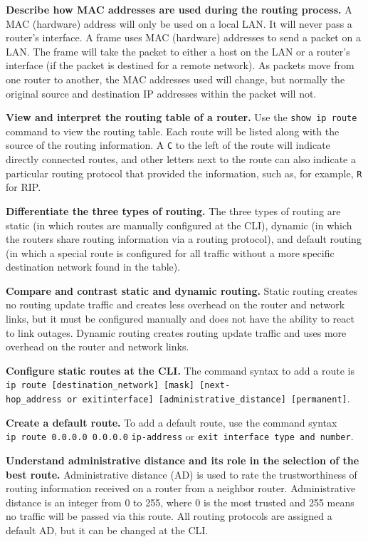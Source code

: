 \textbf{Describe how MAC addresses are used during the routing process.}
A MAC (hardware) address will only be used on a local LAN. It will never
pass a router's interface. A frame uses MAC (hardware) addresses to send
a packet on a LAN. The frame will take the packet to either a host on
the LAN or a router's interface (if the packet is destined for a remote
network). As packets move from one router to another, the MAC addresses
used will change, but normally the original source and destination IP
addresses within the packet will not.

\textbf{View and interpret the routing table of a router.} Use the
\texttt{show\ ip\ route} command to view the routing table. Each route
will be listed along with the source of the routing information. A
\texttt{C} to the left of the route will indicate directly connected
routes, and other letters next to the route can also indicate a
particular routing protocol that provided the information, such as, for
example, \texttt{R} for RIP.

\textbf{Differentiate the three types of routing.} The three types of
routing are static (in which routes are manually configured at the CLI),
dynamic (in which the routers share routing information via a routing
protocol), and default routing (in which a special route is configured
for all traffic without a more specific destination network found in the
table).

\protect\hypertarget{c09.xhtmlux5cux23Page_400}{}{}\textbf{Compare and
contrast static and dynamic routing.} Static routing creates no routing
update traffic and creates less overhead on the router and network
links, but it must be configured manually and does not have the ability
to react to link outages. Dynamic routing creates routing update traffic
and uses more overhead on the router and network links.

\textbf{Configure static routes at the CLI.} The command syntax to add a
route is
\texttt{ip\ route\ {[}destination\_network{]}\ {[}mask{]}\ {[}next-hop\_address\ or\ exitinterface{]}\ {[}administrative\_distance{]}\ {[}permanent{]}}.

\textbf{Create a default route.} To add a default route, use the command
syntax \texttt{ip\ route\ 0.0.0.0\ 0.0.0.0} \texttt{ip-address} or
\texttt{exit\ interface\ type\ and\ number}.

\textbf{Understand administrative distance and its role in the selection
of the best route.} Adminis­trative distance (AD) is used to rate the
trustworthiness of routing information received on a router from a
neighbor router. Administrative distance is an integer from 0 to 255,
where 0 is the most trusted and 255 means no traffic will be passed via
this route. All routing protocols are assigned a default AD, but it can
be changed at the CLI.

